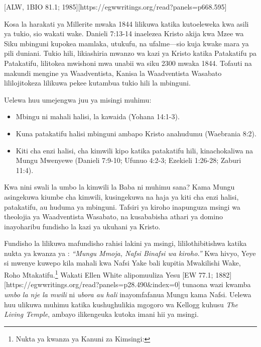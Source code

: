 [ALW, 1BIO 81.1; 1985][https://egwwritings.org/read?panels=p668.595]

Kosa la harakati ya Millerite mwaka 1844 lilikuwa katika kutoeleweka kwa asili ya tukio, sio wakati wake. Danieli 7:13-14 inaelezea Kristo akija kwa Mzee wa Siku mbinguni kupokea mamlaka, utukufu, na ufalme—sio kuja kwake mara ya pili duniani. Tukio hili, likiashiria mwanzo wa kazi ya Kristo katika Patakatifu pa Patakatifu, lilitokea mwishoni mwa unabii wa siku 2300 mwaka 1844. Tofauti na makundi mengine ya Waadventista, Kanisa la Waadventista Wasabato lililojitokeza lilikuwa pekee kutambua tukio hili la mbinguni.

Uelewa huu umejengwa juu ya misingi muhimu:
\begin{itemize}
    \item Mbingu ni mahali halisi, la kawaida (Yohana 14:1-3).
    \item Kuna patakatifu halisi mbinguni ambapo Kristo anahudumu (Waebrania 8:2). 
    \item Kiti cha enzi halisi, cha kimwili kipo katika patakatifu hili, kinachokaliwa na Mungu Mwenyewe (Danieli 7:9-10; Ufunuo 4:2-3; Ezekieli 1:26-28; Zaburi 11:4).
\end{itemize}

Kwa nini swali la umbo la kimwili la Baba ni muhimu sana? Kama Mungu asingekuwa kiumbe cha kimwili, kusingekuwa na haja ya kiti cha enzi halisi, patakatifu, au huduma ya mbinguni. Tafsiri ya kiroho inapunguza msingi wa theolojia ya Waadventista Wasabato, na kusababisha athari ya domino inayoharibu fundisho la kazi ya ukuhani ya Kristo.

Fundisho la  lilikuwa mafundisho rahisi lakini ya msingi, lililothibitishwa katika nukta ya kwanza ya : \textit{“Mungu Mmoja, Nafsi Binafsi wa kiroho.”} Kwa hivyo, Yeye si mwenye kuwepo kila mahali kwa Nafsi Yake bali kupitia Mwakilishi Wake, Roho Mtakatifu.\footnote{Nukta ya kwanza ya Kanuni za Kimsingi: } Wakati Ellen White alipomuuliza Yesu [EW 77.1; 1882][https://egwwritings.org/read?panels=p28.490&index=0] tunaona wazi kwamba \textit{umbo la nje la mwili} ni \textit{ubora au hali} inayomfafanua Mungu kama Nafsi. Uelewa huu ulikuwa muhimu katika kushughulikia mgogoro wa Kellogg kuhusu \textit{The Living Temple}, ambayo ilikengeuka kutoka imani hii ya msingi.

